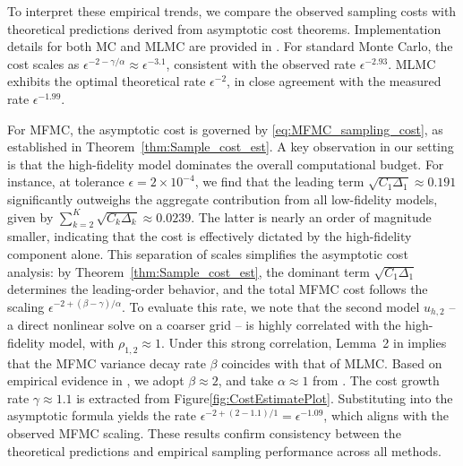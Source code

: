 To interpret these empirical trends, we compare the observed sampling costs with theoretical predictions derived from asymptotic cost theorems. Implementation details for both MC and MLMC are provided in \cite{ElLiSa:2023}.  For standard Monte Carlo, the cost scales as $\epsilon^{-2 - \gamma/\alpha} \approx \epsilon^{-3.1}$, consistent with the observed rate $\epsilon^{-2.93}$. MLMC exhibits the optimal theoretical rate $\epsilon^{-2}$,  in close agreement with the measured rate $\epsilon^{-1.99}$. 

For MFMC, the asymptotic cost is governed by \eqref{eq:MFMC_sampling_cost}, as established in Theorem~\ref{thm:Sample_cost_est}. A key observation in our setting is that the high-fidelity model dominates the overall computational budget. For instance, at tolerance $\epsilon = 2 \times 10^{-4}$, we find that the leading term $\sqrt{C_1 \Delta_1} \approx 0.191$ significantly outweighs the aggregate contribution from all low-fidelity models, given by $\sum_{k=2}^{K} \sqrt{C_k \Delta_k} \approx 0.0239$. The latter is nearly an order of magnitude smaller, indicating that the cost is effectively dictated by the high-fidelity component alone. This separation of scales simplifies the asymptotic cost analysis: by Theorem~\ref{thm:Sample_cost_est}, the dominant term $\sqrt{C_1 \Delta_1}$ determines the leading-order behavior, and the total MFMC cost follows the scaling $\epsilon^{-2 + (\beta - \gamma)/\alpha}$. To evaluate this rate, we note that the second model $u_{h,2}$ -- a direct nonlinear solve on a coarser grid -- is highly correlated with the high-fidelity model, with $\rho_{1,2} \approx 1$. Under this strong correlation, Lemma~2 in \cite{PeGuWi:2018} implies that the MFMC variance decay rate $\beta$ coincides with that of MLMC. Based on empirical evidence in \cite{ElLiSa:2023}, we adopt $\beta \approx 2$, and take $\alpha \approx 1$ from \cite{ElLiSa:2023, ElLiSa:2025}. The cost growth rate $\gamma \approx 1.1$ is extracted from Figure\ref{fig:CostEstimatePlot}. Substituting into the asymptotic formula yields the rate $\epsilon^{-2 + (2 - 1.1)/1} = \epsilon^{-1.09}$, which aligns with the observed MFMC scaling. These results confirm consistency between the theoretical predictions and empirical sampling performance across all methods.


